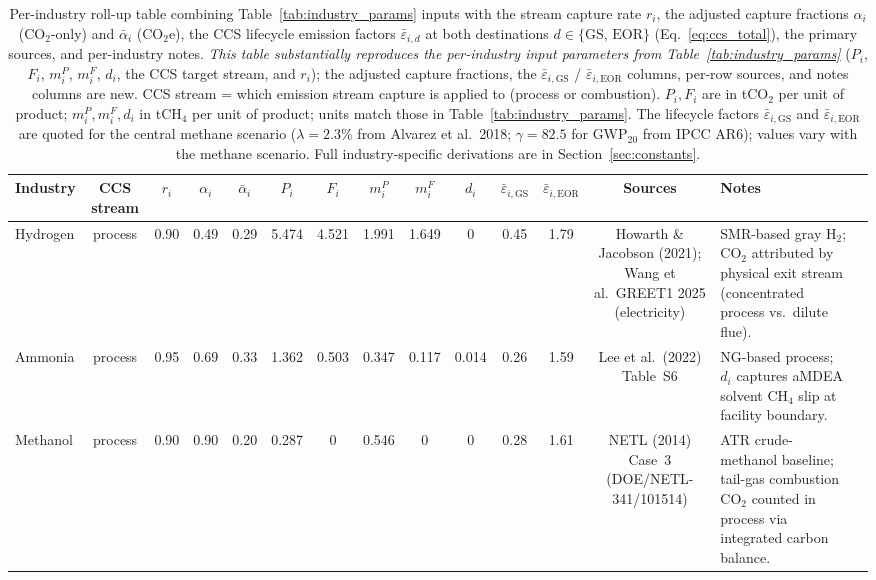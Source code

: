 \documentclass[11pt]{article}
\newcommand{\cotwo}{\ensuremath{\mathrm{CO_2}}}
\newcommand{\chfour}{\ensuremath{\mathrm{CH_4}}}
\begin{document}
\begin{landscape}
\begin{table}[htbp]
\centering
\caption{Per-industry roll-up table combining Table~\ref{tab:industry_params} inputs with the stream capture rate $r_i$, the adjusted capture fractions $\alpha_i$ (CO$_2$-only) and $\bar\alpha_i$ (CO$_2$e), the CCS lifecycle emission factors $\bar\varepsilon_{i,d}$ at both destinations $d \in \{\text{GS, EOR}\}$ (Eq.~\eqref{eq:ccs_total}), the primary sources, and per-industry notes. \emph{This table substantially reproduces the per-industry input parameters from Table~\ref{tab:industry_params}} ($P_i$, $F_i$, $m_i^P$, $m_i^F$, $d_i$, the CCS target stream, and $r_i$); the adjusted capture fractions, the $\bar\varepsilon_{i,\text{GS}}$ / $\bar\varepsilon_{i,\text{EOR}}$ columns, per-row sources, and notes columns are new. CCS stream = which emission stream capture is applied to (process or combustion). $P_i, F_i$ are in t\cotwo{} per unit of product; $m_i^P, m_i^F, d_i$ in t\chfour{} per unit of product; units match those in Table~\ref{tab:industry_params}. The lifecycle factors $\bar\varepsilon_{i,\text{GS}}$ and $\bar\varepsilon_{i,\text{EOR}}$ are quoted for the central methane scenario ($\lambda = 2.3\%$ from Alvarez et al.\ 2018; $\gamma = 82.5$ for GWP$_{20}$ from IPCC AR6); values vary with the methane scenario. Full industry-specific derivations are in Section~\ref{sec:constants}.}
\label{tab:industry_summary}
\scriptsize
\setlength{\tabcolsep}{2.5pt}
\renewcommand{\arraystretch}{1.15}
\begin{tabular}{@{}p{2.1cm}cccccccccccc>{\raggedright\arraybackslash}p{3.6cm}>{\raggedright\arraybackslash}p{4.3cm}@{}}
\toprule
\textbf{Industry} & \textbf{CCS stream} & $r_i$ & $\alpha_i$ & $\bar\alpha_i$ & $P_i$ & $F_i$ & $m_i^P$ & $m_i^F$ & $d_i$ & $\bar\varepsilon_{i,\text{GS}}$ & $\bar\varepsilon_{i,\text{EOR}}$ & \textbf{Sources} & \textbf{Notes} \\
\midrule
Hydrogen & process & 0.90 & 0.49 & 0.29 & 5.474 & 4.521 & 1.991 & 1.649 & 0 & 0.45 & 1.79 & Howarth \& Jacobson (2021); Wang et al.\ GREET1 2025 (electricity) & SMR-based gray H$_2$; CO$_2$ attributed by physical exit stream (concentrated process vs.\ dilute flue). \\
Ammonia & process & 0.95 & 0.69 & 0.33 & 1.362 & 0.503 & 0.347 & 0.117 & 0.014 & 0.26 & 1.59 & Lee et al.\ (2022) Table~S6 & NG-based process; $d_i$ captures aMDEA solvent CH$_4$ slip at facility boundary. \\
Methanol & process & 0.90 & 0.90 & 0.20 & 0.287 & 0 & 0.546 & 0 & 0 & 0.28 & 1.61 & NETL (2014) Case~3 (DOE/NETL-341/101514) & ATR crude-methanol baseline; tail-gas combustion CO$_2$ counted in process via integrated carbon balance. \\

\end{tabular}
\end{table}
\end{landscape}
\end{document}
